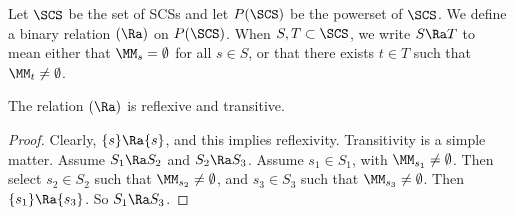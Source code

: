 \begin{definition}[$\Ra$] 
Let $\SCS$ be the set of SCSs
and let $P(\SCS)$ be the powerset of $\SCS$. 
We define a binary relation $(\Ra)$ on $P(\SCS)$.  When $S,T\subset \SCS$, we write
$S\Ra T$ to mean  either that $\MM_s=\emptyset$ for all $s\in S$,
or that there exists $t\in T$ such that $\MM_t\ne\emptyset$.
\end{definition}

\begin{lemma}
The relation $(\Ra)$  is reflexive and transitive.
\end{lemma}

\begin{proof}  Clearly, $\{s \}\Ra \{s\}$, and this implies reflexivity.
Transitivity is a simple matter.  Assume
$S_1\Ra S_2$ and $S_2\Ra S_3$.  Assume $s_1\in S_1$, with $\MM_{s_1}\ne \emptyset$.
Then select
$s_2\in S_2$ such that $\MM_{s_2}\ne\emptyset$, and $s_3\in S_3$ such
that $\MM_{s_3}\ne\emptyset$.  Then $\{s_1\}\Ra\{s_3\}$.  So $S_1\Ra S_3$.
\end{proof}




